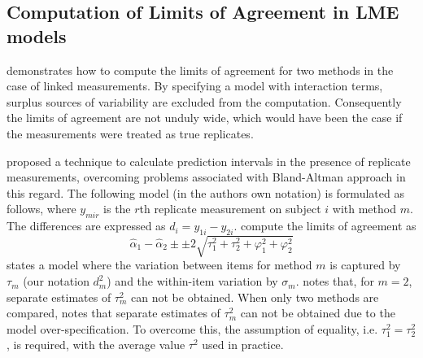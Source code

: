 \documentclass[12pt, a4paper]{report}
\theoremstyle{plain}
\theoremstyle{definition}
\theoremstyle{remark}
\begin{document}
	
	
	
	
	\subsection{Computation of Limits of Agreement in LME models}
	
	
\citet{BXC2008} demonstrates how to compute the limits of agreement for two methods in the case of linked measurements. By specifying a model with interaction terms, surplus sources of variability are excluded from the computation. Consequently the limits of agreement are not unduly wide, which would have been the case if the measurements were treated as true replicates.


\citet{BXC2008} proposed a technique to calculate prediction intervals in the presence of replicate measurements, overcoming problems associated with Bland-Altman approach in this regard. The following model (in the authors own notation) is
formulated as follows, where $y_{mir}$ is the $r$th replicate
measurement on subject $i$ with method $m$. The differences are expressed as $d_{i} = y_{1i} - y_{2i}$. \citet{BXC2008} compute the limits of agreement as
\begin{equation}
\hat{\alpha}_1 - \hat{\alpha}_2 \pm \pm 2 \sqrt{ \tau^2_1 +  \tau^2_2 +  \varphi^2_1 +  \varphi^2_2 }
\label{BXC-LOA-1}
\end{equation}
		\citet{BXC2008} states a model where the variation between items for method $m$ is captured by $\tau_m$ (our notation $d^2_m$) and the within-item variation by $\sigma_m$. \citet{BXC2008} notes that, for $m=2$, separate estimates of $\tau^2_m$ can not be obtained.  When only two methods are compared, \citet{BXC2008} notes that separate estimates of $\tau^2_m$ can not be obtained due to the model over-specification. To overcome this, the assumption of equality, i.e. $\tau^2_1 = \tau^2_2$, is required, with the average value $\tau^2$ used in practice.
	
\end{document}
